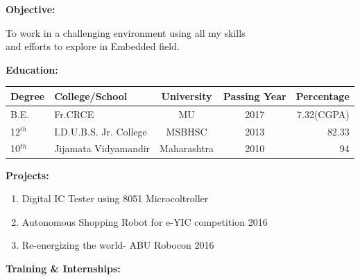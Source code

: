 \documentclass[a4paper]{article}
\begin{document}
	\vspace{-3mm}
 \begin{flushleft}
 	\begin{Large}\textbf{Objective:}\end{Large}  To work in a challenging environment using all my skills\\\hspace{1in} and efforts to explore in Embedded field.\\
 	
 	\begin{Large}\vspace{0.3in}\textbf{Education:}\end{Large}
 	\vspace{-3mm}
 	\begin{center}
 	\begin{tabular}{|l|l|c|c|r|}
 	\hline
 	Degree & College/School & University & Passing Year & Percentage\\ \hline
 
 	B.E. & Fr.CRCE & MU & 2017 & 7.32(CGPA)\\ \hline
 
 	12$^{th}$ & I.D.U.B.S. Jr. College & MSBHSC & 2013 & 82.33\\ \hline
 
	10$^{th}$ & Jijamata Vidyamandir & Maharashtra & 2010 & 94\\ \hline

 	\end{tabular}
    \end{center}
    
    
  	\begin{Large}\vspace{0.1in}\textbf{Projects:}\end{Large}
  	\begin{enumerate}
  		\item Digital IC Tester using 8051 Microcoltroller
  		\item Autonomous Shopping Robot for e-YIC competition 2016
  		\item Re-energizing the world- ABU Robocon 2016
  	\end{enumerate}
  	
  	
  	
  
	  	\begin{Large}\vspace{0.1in}\textbf{Training \& Internships:}\end{Large}\\
	  	\begin{itemize}
	  		

\end{itemize}
\end{flushleft}
\end{document}
